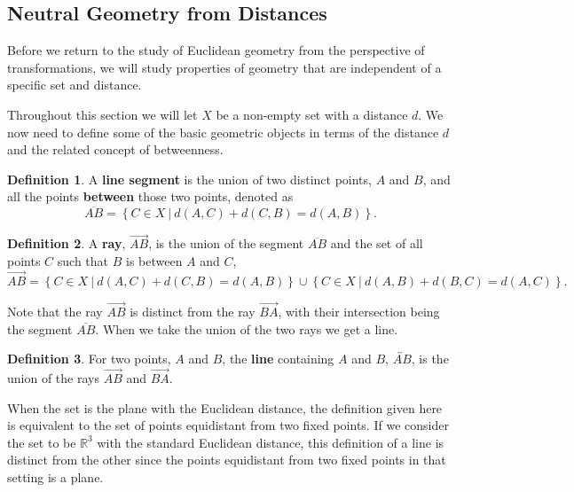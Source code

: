 \documentclass[
]{book}
\theoremstyle{definition}
\newtheorem{definition}{Definition}[chapter]
\theoremstyle{definition}
\theoremstyle{definition}
\theoremstyle{definition}
\theoremstyle{remark}
\begin{document}
\hypertarget{neutral-geometry-from-distances}{%
\subsection{Neutral Geometry from Distances}\label{neutral-geometry-from-distances}}

Before we return to the study of Euclidean geometry from the perspective of transformations, we will study properties of geometry that are independent of a specific set and distance.

Throughout this section we will let \(X\) be a non-empty set with a distance \(d\). We now need to define some of the basic geometric objects in terms of the distance \(d\) and the related concept of betweenness.

\begin{definition}
A \textbf{line segment} is the union of two distinct points, \(A\) and \(B\), and all the points \textbf{between} those two points, denoted as \[\overline{AB} = \left\{ C \in X \: \vert \: d(A,C) + d(C,B) = d(A,B)\right\}.\]
\end{definition}

\begin{definition}
A \textbf{ray}, \(\overrightarrow{AB}\), is the union of the segment \(\overline{AB}\) and the set of all points \(C\) such that \(B\) is between \(A\) and \(C\),
\[\overrightarrow{AB} = \left\{C \in X \: \vert \: d(A,C)+d(C,B)=d(A,B)\right\} \cup \left\{C \in X \: \vert \: d(A,B)+d(B,C)=d(A,C)\right\}.\]
\end{definition}

Note that the ray \(\overrightarrow{AB}\) is distinct from the ray \(\overrightarrow{BA}\), with their intersection being the segment \(\overline{AB}\). When we take the union of the two rays we get a line.

\begin{definition}
For two points, \(A\) and \(B\), the \textbf{line} containing \(A\) and \(B\), \(\overleftrightarrow{AB}\), is the union of the rays \(\overrightarrow{AB}\) and \(\overrightarrow{BA}\).
\end{definition}

When the set is the plane with the Euclidean distance, the definition given here is equivalent to the set of points equidistant from two fixed points. If we consider the set to be \(\mathbb{R}^3\) with the standard Euclidean distance, this definition of a line is distinct from the other since the points equidistant from two fixed points in that setting is a plane.
\end{document}
